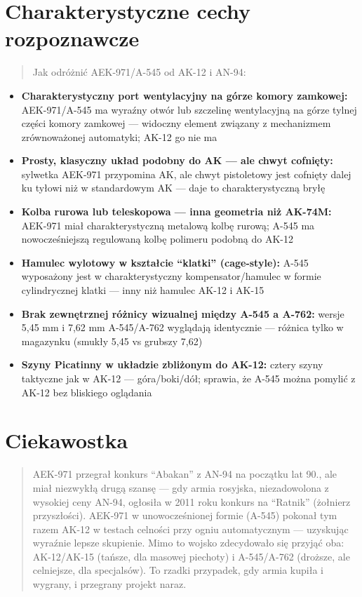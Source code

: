 \documentclass[12pt,openany,oneside]{book}
\providecommand{\tightlist}{%
  \setlength{\itemsep}{0pt}\setlength{\parskip}{0pt}}
\begin{document}
\section{Charakterystyczne cechy
rozpoznawcze}\label{charakterystyczne-cechy-rozpoznawcze-51}

\begin{quote}
Jak odróżnić AEK-971/A-545 od AK-12 i AN-94:
\end{quote}

\begin{itemize}
\tightlist
\item
  \textbf{Charakterystyczny port wentylacyjny na górze komory zamkowej:}
  AEK-971/A-545 ma wyraźny otwór lub szczelinę wentylacyjną na górze
  tylnej części komory zamkowej --- widoczny element związany z
  mechanizmem zrównoważonej automatyki; AK-12 go nie ma
\item
  \textbf{Prosty, klasyczny układ podobny do AK --- ale chwyt cofnięty:}
  sylwetka AEK-971 przypomina AK, ale chwyt pistoletowy jest cofnięty
  dalej ku tyłowi niż w standardowym AK --- daje to charakterystyczną
  bryłę
\item
  \textbf{Kolba rurowa lub teleskopowa --- inna geometria niż AK-74M:}
  AEK-971 miał charakterystyczną metalową kolbę rurową; A-545 ma
  nowocześniejszą regulowaną kolbę polimeru podobną do AK-12
\item
  \textbf{Hamulec wylotowy w kształcie ``klatki'' (cage-style):} A-545
  wyposażony jest w charakterystyczny kompensator/hamulec w formie
  cylindrycznej klatki --- inny niż hamulec AK-12 i AK-15
\item
  \textbf{Brak zewnętrznej różnicy wizualnej między A-545 a A-762:}
  wersje 5,45 mm i 7,62 mm A-545/A-762 wyglądają identycznie --- różnica
  tylko w magazynku (smukły 5,45 vs grubszy 7,62)
\item
  \textbf{Szyny Picatinny w układzie zbliżonym do AK-12:} cztery szyny
  taktyczne jak w AK-12 --- góra/boki/dół; sprawia, że A-545 można
  pomylić z AK-12 bez bliskiego oglądania
\end{itemize}

\section{Ciekawostka}\label{ciekawostka-51}

\begin{quote}
AEK-971 przegrał konkurs ``Abakan'' z AN-94 na początku lat 90., ale
miał niezwykłą drugą szansę --- gdy armia rosyjska, niezadowolona z
wysokiej ceny AN-94, ogłosiła w 2011 roku konkurs na ``Ratnik''
(żołnierz przyszłości). AEK-971 w unowocześnionej formie (A-545) pokonał
tym razem AK-12 w testach celności przy ogniu automatycznym ---
uzyskując wyraźnie lepsze skupienie. Mimo to wojsko zdecydowało się
przyjąć oba: AK-12/AK-15 (tańsze, dla masowej piechoty) i A-545/A-762
(droższe, ale celniejsze, dla specjalsów). To rzadki przypadek, gdy
armia kupiła i wygrany, i przegrany projekt naraz.
\end{quote}
\end{document}

